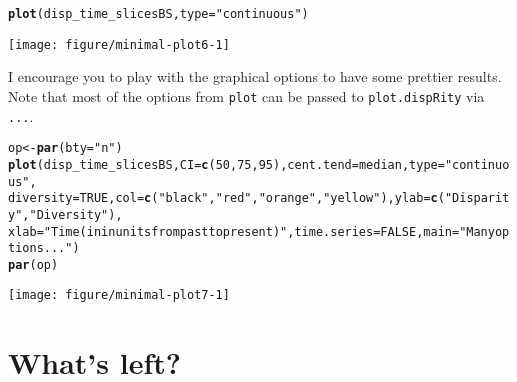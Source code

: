 \documentclass{article}\usepackage[]{graphicx}\usepackage[]{color}
\makeatletter
\newcommand{\hlnum}[1]{\textcolor[rgb]{0.686,0.059,0.569}{#1}}%
\newcommand{\hlstr}[1]{\textcolor[rgb]{0.192,0.494,0.8}{#1}}%
\newcommand{\hlstd}[1]{\textcolor[rgb]{0.345,0.345,0.345}{#1}}%
\newcommand{\hlkwb}[1]{\textcolor[rgb]{0.69,0.353,0.396}{#1}}%
\newcommand{\hlkwc}[1]{\textcolor[rgb]{0.333,0.667,0.333}{#1}}%
\newcommand{\hlkwd}[1]{\textcolor[rgb]{0.737,0.353,0.396}{\textbf{#1}}}%
\newenvironment{kframe}{%
 \def\at@end@of@kframe{}%
 \ifinner\ifhmode%
  \def\at@end@of@kframe{\end{minipage}}%
  \begin{minipage}{\columnwidth}%
 \fi\fi%
 \def\FrameCommand##1{\hskip\@totalleftmargin \hskip-\fboxsep
 \colorbox{shadecolor}{##1}\hskip-\fboxsep
     \hskip-\linewidth \hskip-\@totalleftmargin \hskip\columnwidth}%
 \MakeFramed {\advance\hsize-\width
   \@totalleftmargin\z@ \linewidth\hsize
   \@setminipage}}%
 {\par\unskip\endMakeFramed%
 \at@end@of@kframe}
\newenvironment{knitrout}{}{} %
\makeatother
\begin{document}
\begin{knitrout}
\color{fgcolor}\begin{kframe}
\begin{alltt}
\hlkwd{plot}\hlstd{(disp_time_slicesBS,} \hlkwc{type} \hlstd{=} \hlstr{"continuous"}\hlstd{)}
\end{alltt}
\end{kframe}

{\centering \texttt{[image: figure/minimal-plot6-1]} 

}



\end{knitrout}

I encourage you to play with the graphical options to have some prettier results.
Note that most of the options from \texttt{plot} can be passed to \texttt{plot.dispRity} via \texttt{...}.

\begin{knitrout}
\color{fgcolor}\begin{kframe}
\begin{alltt}
\hlstd{op}\hlkwb{<-}\hlkwd{par}\hlstd{(}\hlkwc{bty}\hlstd{=}\hlstr{"n"}\hlstd{)}
\hlkwd{plot}\hlstd{(disp_time_slicesBS,} \hlkwc{CI} \hlstd{=} \hlkwd{c}\hlstd{(}\hlnum{50}\hlstd{,} \hlnum{75}\hlstd{,} \hlnum{95}\hlstd{),} \hlkwc{cent.tend} \hlstd{= median,} \hlkwc{type} \hlstd{=} \hlstr{"continuous"}\hlstd{,}
    \hlkwc{diversity} \hlstd{=} \hlnum{TRUE}\hlstd{,} \hlkwc{col} \hlstd{=} \hlkwd{c}\hlstd{(}\hlstr{"black"}\hlstd{,} \hlstr{"red"}\hlstd{,} \hlstr{"orange"}\hlstd{,} \hlstr{"yellow"}\hlstd{),} \hlkwc{ylab} \hlstd{=} \hlkwd{c}\hlstd{(}\hlstr{"Disparity"}\hlstd{,} \hlstr{"Diversity"}\hlstd{),}
    \hlkwc{xlab} \hlstd{=} \hlstr{"Time (in in units from past to present)"}\hlstd{,} \hlkwc{time.series} \hlstd{=} \hlnum{FALSE}\hlstd{,} \hlkwc{main} \hlstd{=} \hlstr{"Many options..."}\hlstd{)}
\hlkwd{par}\hlstd{(op)}
\end{alltt}
\end{kframe}

{\centering \texttt{[image: figure/minimal-plot7-1]} 

}



\end{knitrout}

\section{What's left?}
\label{whatsleft}




\end{document}
